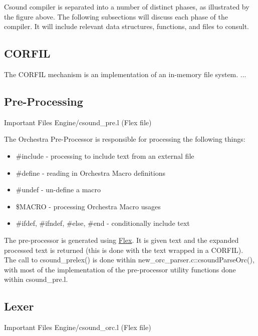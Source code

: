\documentclass[]{book}
\begin{document}
Csound compiler is separated into a number of distinct phases, as illustrated by the figure above. The following subsections will discuss each phase of the compiler.  It will include relevant data structures, functions, and files to consult.  

\subsection{CORFIL}

The CORFIL mechanism is an implementation of an in-memory file system. ...

\subsection{Pre-Processing}

\begin{bclogo}[couleur=blue!30,arrondi=0.1,ombre=true,logo=\bcetoile]
{Important Files}
Engine/csound\_pre.l (Flex file)
\end{bclogo}

The Orchestra Pre-Processor is responsible for processing the following things:

\begin{itemize}
  \item \#include - processing to include text from an external file
  \item \#define - reading in Orchestra Macro definitions
  \item \#undef - un-define a macro
  \item \$MACRO - processing Orchestra Macro usages
  \item \#ifdef, \#ifndef, \#else, \#end - conditionally include text
\end{itemize}

The pre-processor is generated using \href{http://flex.sourceforge.net/}{Flex}. It is given text and the expanded processed text is returned (this is done with the text wrapped in a CORFIL). The call to csound\_prelex() is done within new\_orc\_parser.c::csoundParseOrc(), with most of the implementation of the pre-processor utility functions done within csound\_pre.l.

\subsection{Lexer}

\begin{bclogo}[couleur=blue!30,arrondi=0.1,ombre=true,logo=\bcetoile]
{Important Files}
Engine/csound\_orc.l (Flex file)
\end{bclogo}
\end{document}
